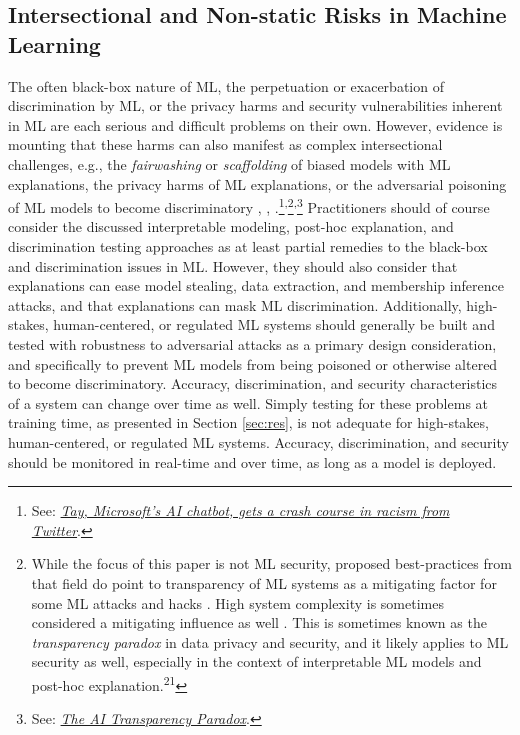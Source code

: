 \documentclass[information,article,submit,moreauthors,pdftex]{definitions/mdpi}
\begin{document}
\subsection{Intersectional and Non-static Risks in Machine Learning}

The often black-box nature of ML, the perpetuation or exacerbation of discrimination by ML, or the privacy harms and security vulnerabilities inherent in ML are each serious and difficult problems on their own. However, evidence is mounting that these harms can also manifest as complex intersectional challenges, e.g., the \textit{fairwashing} or \textit{scaffolding} of biased models with ML explanations, the privacy harms of ML explanations, or the adversarial poisoning of ML models to become discriminatory \cite{shokri2019privacy}, \cite{fair_washing}, \cite{scaffolding}.\footnote{See: \href{https://www.theguardian.com/technology/2016/mar/24/tay-microsofts-ai-chatbot-gets-a-crash-course-in-racism-from-twitter}{\textit{Tay, Microsoft's AI chatbot, gets a crash course in racism from Twitter}}.}\textsuperscript{,}\footnote{While the focus of this paper is not ML security, proposed best-practices from that field do point to transparency of ML systems as a mitigating factor for some ML attacks and hacks \cite{papernot2018marauder}. High system complexity is sometimes considered a mitigating influence as well \cite{hoare19811980}. This is sometimes known as the \textit{transparency paradox} in data privacy and security, and it likely applies to ML security as well, especially in the context of interpretable ML models and post-hoc explanation.\textsuperscript{21}}\textsuperscript{,}\footnote{See: \href{https://hbr.org/2019/12/the-ai-transparency-paradox}{\textit{The AI Transparency Paradox}}.} Practitioners should of course consider the discussed interpretable modeling, post-hoc explanation, and discrimination testing approaches as at least partial remedies to the black-box and discrimination issues in ML. However, they should also consider that explanations can ease model stealing, data extraction, and membership inference attacks, and that explanations can mask ML discrimination. Additionally, high-stakes, human-centered, or regulated ML systems should generally be built and tested with robustness to adversarial attacks as a primary design consideration, and specifically to prevent ML models from being poisoned or otherwise altered to become discriminatory. Accuracy, discrimination, and security characteristics of a system can change over time as well. Simply testing for these problems at training time, as presented in Section \ref{sec:res}, is not adequate for high-stakes, human-centered, or regulated ML systems. Accuracy, discrimination, and security should be monitored in real-time and over time, as long as a model is deployed.
\end{document}
